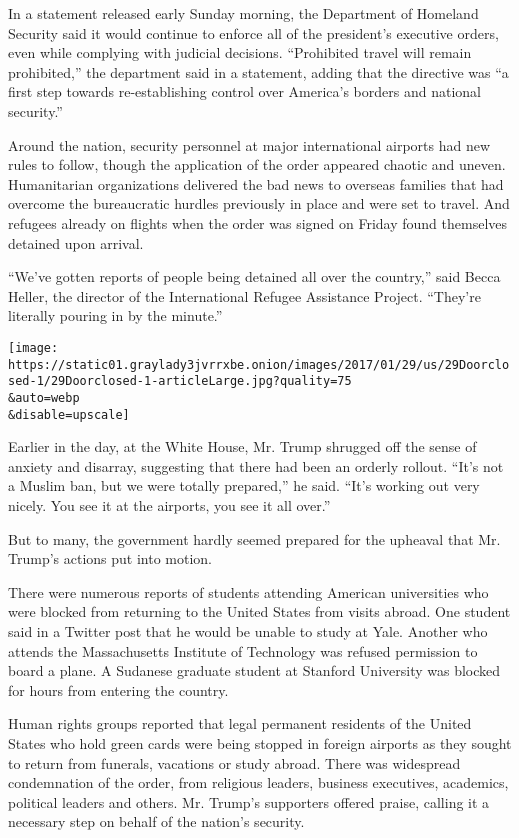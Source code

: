 In a statement released early Sunday morning, the Department of Homeland
Security said it would continue to enforce all of the president's
executive orders, even while complying with judicial decisions.
``Prohibited travel will remain prohibited,'' the department said in a
statement, adding that the directive was ``a first step towards
re-establishing control over America's borders and national security.''

Around the nation, security personnel at major international airports
had new rules to follow, though the application of the order appeared
chaotic and uneven. Humanitarian organizations delivered the bad news to
overseas families that had overcome the bureaucratic hurdles previously
in place and were set to travel. And refugees already on flights when
the order was signed on Friday found themselves detained upon arrival.

``We've gotten reports of people being detained all over the country,''
said Becca Heller, the director of the International Refugee Assistance
Project. ``They're literally pouring in by the minute.''

\texttt{[image: https://static01.graylady3jvrrxbe.onion/images/2017/01/29/us/29Doorclosed-1/29Doorclosed-1-articleLarge.jpg?quality=75\\\&auto=webp\\\&disable=upscale]}

Earlier in the day, at the White House, Mr. Trump shrugged off the sense
of anxiety and disarray, suggesting that there had been an orderly
rollout. ``It's not a Muslim ban, but we were totally prepared,'' he
said. ``It's working out very nicely. You see it at the airports, you
see it all over.''

But to many, the government hardly seemed prepared for the upheaval that
Mr. Trump's actions put into motion.

There were numerous reports of students attending American universities
who were blocked from returning to the United States from visits abroad.
One student said in a Twitter post that he would be unable to study at
Yale. Another who attends the Massachusetts Institute of Technology was
refused permission to board a plane. A Sudanese graduate student at
Stanford University was blocked for hours from entering the country.

Human rights groups reported that legal permanent residents of the
United States who hold green cards were being stopped in foreign
airports as they sought to return from funerals, vacations or study
abroad. There was widespread condemnation of the order, from religious
leaders, business executives, academics, political leaders and others.
Mr. Trump's supporters offered praise, calling it a necessary step on
behalf of the nation's security.

